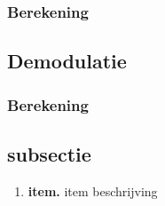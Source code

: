 \documentclass[11pt,a4paper]{article}
\newcommand\litem[1]{\item{\bfseries#1.\space}}
\begin{document}
			\subsubsection{Berekening}
			
		\subsection{Demodulatie}
			\subsubsection{Berekening}
	\subsection{subsectie}
	
			\begin{enumerate}[label=\emph{\alph*)}]
				\litem{item} item beschrijving
			\end{enumerate}
	


	
	
\end{document}
